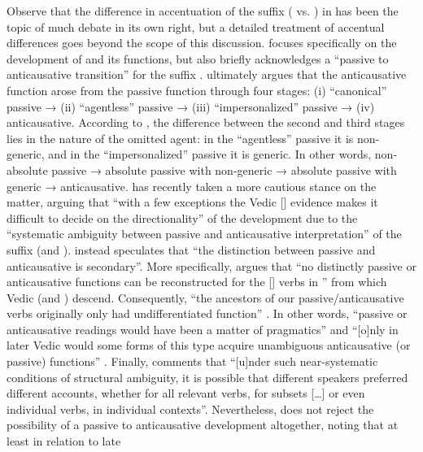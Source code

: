 Observe that the difference in accentuation of the suffix ( vs. ) in  has been the topic of much debate in its own right, but a detailed treatment of accentual differences goes beyond the scope of this discussion. \cite[246]{kulikov:2011b} focuses specifically on the development of  and its functions, but also briefly acknowledges a “passive to anticausative transition” for the suffix . \cite[248]{kulikov:2011b} ultimately argues that the anticausative function arose from the passive function through four stages: (i) “canonical” passive → (ii) “agentless” passive → (iii) “impersonalized” passive → (iv) anticausative. According to \citeauthor{kulikov:2011b}, the difference between the second and third stages lies in the nature of the omitted agent: in the “agentless” passive it is non-generic, and in the “impersonalized” passive it is generic. In other words, non-absolute passive → absolute passive with non-generic  → absolute passive with generic  → anticausative. \cite[182]{hock:2019} has recently taken a more cautious stance on the matter, arguing that “with a few exceptions the Vedic [] evidence makes it difficult to decide on the directionality” of the development due to the “systematic ambiguity between passive and anticausative interpretation” of the suffix  (and ). \cite[188]{hock:2019} instead speculates that “the distinction between passive and anticausative is secondary”. More specifically, \cite[188f.]{hock:2019} argues that “no distinctly passive or anticausative functions can be reconstructed for the [] verbs in ” from which Vedic   (and ) descend. Consequently, “the ancestors of our passive/anticausative verbs originally only had undifferentiated  function” \citep[189]{hock:2019}. In other words, “passive or anticausative readings would have been a matter of pragmatics” and “[o]nly in later Vedic would some forms of this type acquire unambiguous anticausative (or passive) functions” \citep[189]{hock:2019}. Finally, \cite[190]{hock:2019} comments that “[u]nder such near-systematic conditions of structural ambiguity, it is possible that different speakers preferred different accounts, whether for all relevant verbs, for subsets […] or even individual verbs, in individual contexts”. Nevertheless, \citeauthor{hock:2019} does not reject the possibility of a passive to anticausative development altogether, noting that at least in relation to late 